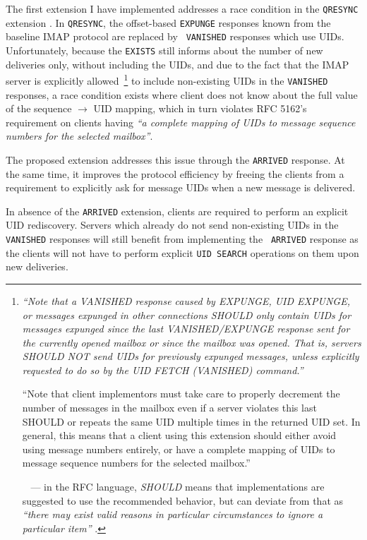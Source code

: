 \documentclass[trojita]{subfiles}
\begin{document}
The first extension I have implemented addresses a race condition in the {\tt QRESYNC} extension \cite{rfc5162}.  In
{\tt QRESYNC}, the offset-based {\tt EXPUNGE} responses known from the baseline IMAP protocol are replaced by {\tt
VANISHED} responses which use UIDs.  Unfortunately, because the {\tt EXISTS} still informs about the number of new
deliveries only, without including the UIDs, and due to the fact that the IMAP server is explicitly
allowed~\footnote{{\em``Note that a VANISHED response caused by EXPUNGE, UID EXPUNGE, or messages expunged in other
connections SHOULD only contain UIDs for messages expunged since the last VANISHED/EXPUNGE response sent for the
currently opened mailbox or since the mailbox was opened.  That is, servers SHOULD NOT send UIDs for previously expunged
messages, unless explicitly requested to do so by the UID FETCH (VANISHED) command.''

``Note that client implementors must take care to properly decrement the number of messages in the mailbox even if
a server violates this last SHOULD or repeats the same UID multiple times in the returned UID set.  In general, this
means that a client using this extension should either avoid using message numbers entirely, or have a complete mapping
of UIDs to message sequence numbers for the selected mailbox.''}~\cite[p. 12]{rfc5162} --- in the
RFC language, {\em SHOULD} means that implementations are suggested to use the recommended behavior, but can deviate
from that as {\em ``there may exist valid reasons in particular circumstances to ignore a particular item''}
\cite{rfc2092}.} to include non-existing UIDs in the {\tt VANISHED} responses, a race condition exists where client does
not know about the full value of the sequence $\rightarrow$ UID mapping, which in turn violates RFC 5162's requirement
on clients having {\em ``a complete mapping of UIDs to message sequence numbers for the selected mailbox''}.

The proposed extension addresses this issue through the {\tt ARRIVED} response.  At the same time, it improves the
protocol efficiency by freeing the clients from a requirement to explicitly ask for message UIDs when a new message is
delivered.

In absence of the {\tt ARRIVED} extension, clients are required to perform an explicit UID rediscovery.  Servers which
already do not send non-existing UIDs in the {\tt VANISHED} responses will still benefit from implementing the {\tt
ARRIVED} response as the clients will not have to perform explicit {\tt UID SEARCH} operations on them upon new
deliveries.
\end{document}
